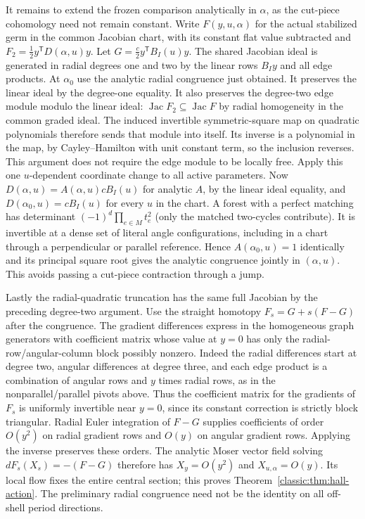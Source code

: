 It remains to extend the frozen comparison analytically in
\(\alpha\), as the cut-piece cohomology need not remain
constant. Write \(F(y,u,\alpha)\) for the actual stabilized
germ in the common Jacobian chart, with its constant flat value
subtracted and \(F_2=\tfrac12 y^{\mathsf T}D(\alpha,u)y\).
Let \(G=\tfrac{c}{2}y^{\mathsf T}B_I(u)y\). The shared
Jacobian ideal is generated in radial degrees one and two
by the linear rows \(B_Iy\) and all edge products. At
\(\alpha_0\) use the analytic radial congruence just obtained.
It preserves the linear ideal by the degree-one equality.
It also preserves the degree-two edge module modulo the
linear ideal: \(\operatorname{Jac}F_2\subseteq
\operatorname{Jac}F\) by radial homogeneity in the common
graded ideal. The induced invertible symmetric-square map
on quadratic polynomials therefore sends that module into
itself. Its inverse is a polynomial in the map, by
Cayley--Hamilton with unit constant term, so the inclusion
reverses. This argument does not require the edge module to
be locally free. Apply this one \(u\)-dependent coordinate
change to all active parameters. Now
\(D(\alpha,u)=A(\alpha,u)cB_I(u)\) for analytic \(A\), by
the linear ideal equality, and \(D(\alpha_0,u)=cB_I(u)\)
for every \(u\) in the chart. A forest with a perfect matching
has determinant \((-1)^d\prod_{e\in M}t_e^2\) (only the
matched two-cycles contribute). It is invertible at a dense
set of literal angle configurations, including in a chart
through a perpendicular or parallel reference. Hence
\(A(\alpha_0,u)=1\) identically and its principal square root
gives the analytic congruence jointly in \((\alpha,u)\).
This avoids passing a cut-piece contraction through a jump.

Lastly the radial-quadratic truncation has the same full
Jacobian by the preceding degree-two argument. Use the
straight homotopy \(F_s=G+s(F-G)\) after the congruence.
The gradient differences express in the homogeneous graph
generators with coefficient matrix whose value at \(y=0\)
has only the radial-row/angular-column block possibly
nonzero. Indeed the radial differences start at degree two,
angular differences at degree three, and each edge product
is a combination of angular rows and \(y\) times radial
rows, as in the nonparallel/parallel pivots above. Thus
the coefficient matrix for the gradients of \(F_s\) is
uniformly invertible near \(y=0\), since its constant
correction is strictly block triangular. Radial Euler
integration of \(F-G\) supplies coefficients of order
\(O(y^2)\) on radial gradient rows and \(O(y)\) on angular
gradient rows. Applying the inverse preserves these orders.
The analytic Moser vector field solving
\(dF_s(X_s)=-(F-G)\) therefore has \(X_y=O(y^2)\) and
\(X_{u,\alpha}=O(y)\). Its local flow fixes the entire
central section; this proves Theorem~\ref{classic:thm:hall-action}.
The preliminary radial congruence need not be the identity
on all off-shell period directions.

